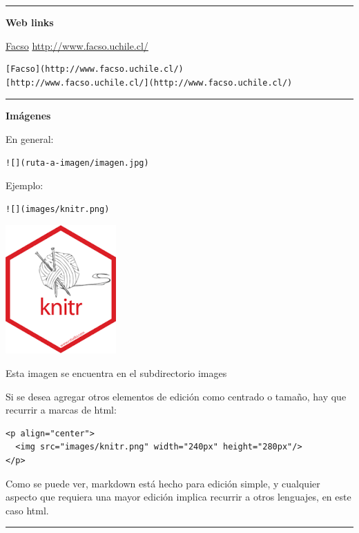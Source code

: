 \documentclass[
  11pt,
]{book}
\begin{document}
\begin{center}\rule{0.5\linewidth}{0.5pt}\end{center}

\textbf{Web links}

\href{http://www.facso.uchile.cl/}{Facso}
\url{http://www.facso.uchile.cl/}

\begin{verbatim}
[Facso](http://www.facso.uchile.cl/)
[http://www.facso.uchile.cl/](http://www.facso.uchile.cl/)
\end{verbatim}

\begin{center}\rule{0.5\linewidth}{0.5pt}\end{center}

\textbf{Imágenes}

En general:

\begin{verbatim}
![](ruta-a-imagen/imagen.jpg)
\end{verbatim}

Ejemplo:

\begin{verbatim}
![](images/knitr.png)
\end{verbatim}

\includegraphics{images/knitr.png}

Esta imagen se encuentra en el subdirectorio images

Si se desea agregar otros elementos de edición como centrado o tamaño, hay que recurrir a marcas de html:

\begin{verbatim}
<p align="center">
  <img src="images/knitr.png" width="240px" height="280px"/>
</p>
\end{verbatim}

Como se puede ver, markdown está hecho para edición simple, y cualquier aspecto que requiera una mayor edición implica recurrir a otros lenguajes, en este caso html.

\begin{center}\rule{0.5\linewidth}{0.5pt}\end{center}
\end{document}
